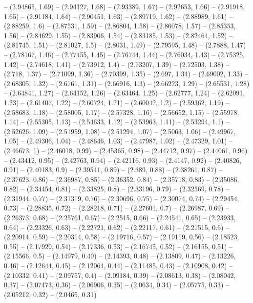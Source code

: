 -- (2.94865, 1.69)
-- (2.94127, 1.68)
-- (2.93389, 1.67)
-- (2.92653, 1.66)
-- (2.91918, 1.65)
-- (2.91184, 1.64)
-- (2.90451, 1.63)
-- (2.89719, 1.62)
-- (2.88989, 1.61)
-- (2.88259, 1.6)
-- (2.87531, 1.59)
-- (2.86804, 1.58)
-- (2.86078, 1.57)
-- (2.85353, 1.56)
-- (2.84629, 1.55)
-- (2.83906, 1.54)
-- (2.83185, 1.53)
-- (2.82464, 1.52)
-- (2.81745, 1.51)
-- (2.81027, 1.5)
-- (2.8031, 1.49)
-- (2.79595, 1.48)
-- (2.7888, 1.47)
-- (2.78167, 1.46)
-- (2.77455, 1.45)
-- (2.76744, 1.44)
-- (2.76034, 1.43)
-- (2.75325, 1.42)
-- (2.74618, 1.41)
-- (2.73912, 1.4)
-- (2.73207, 1.39)
-- (2.72503, 1.38)
-- (2.718, 1.37)
-- (2.71099, 1.36)
-- (2.70399, 1.35)
-- (2.697, 1.34)
-- (2.69002, 1.33)
-- (2.68305, 1.32)
-- (2.6761, 1.31)
-- (2.66916, 1.3)
-- (2.66223, 1.29)
-- (2.65531, 1.28)
-- (2.64841, 1.27)
-- (2.64152, 1.26)
-- (2.63464, 1.25)
-- (2.62777, 1.24)
-- (2.62091, 1.23)
-- (2.61407, 1.22)
-- (2.60724, 1.21)
-- (2.60042, 1.2)
-- (2.59362, 1.19)
-- (2.58683, 1.18)
-- (2.58005, 1.17)
-- (2.57328, 1.16)
-- (2.56652, 1.15)
-- (2.55978, 1.14)
-- (2.55305, 1.13)
-- (2.54633, 1.12)
-- (2.53963, 1.11)
-- (2.53294, 1.1)
-- (2.52626, 1.09)
-- (2.51959, 1.08)
-- (2.51294, 1.07)
-- (2.5063, 1.06)
-- (2.49967, 1.05)
-- (2.49306, 1.04)
-- (2.48646, 1.03)
-- (2.47987, 1.02)
-- (2.47329, 1.01)
-- (2.46673, 1)
-- (2.46018, 0.99)
-- (2.45365, 0.98)
-- (2.44712, 0.97)
-- (2.44061, 0.96)
-- (2.43412, 0.95)
-- (2.42763, 0.94)
-- (2.42116, 0.93)
-- (2.4147, 0.92)
-- (2.40826, 0.91)
-- (2.40183, 0.9)
-- (2.39541, 0.89)
-- (2.389, 0.88)
-- (2.38261, 0.87)
-- (2.37623, 0.86)
-- (2.36987, 0.85)
-- (2.36352, 0.84)
-- (2.35718, 0.83)
-- (2.35086, 0.82)
-- (2.34454, 0.81)
-- (2.33825, 0.8)
-- (2.33196, 0.79)
-- (2.32569, 0.78)
-- (2.31944, 0.77)
-- (2.31319, 0.76)
-- (2.30696, 0.75)
-- (2.30074, 0.74)
-- (2.29454, 0.73)
-- (2.28835, 0.72)
-- (2.28218, 0.71)
-- (2.27601, 0.7)
-- (2.26987, 0.69)
-- (2.26373, 0.68)
-- (2.25761, 0.67)
-- (2.2515, 0.66)
-- (2.24541, 0.65)
-- (2.23933, 0.64)
-- (2.23326, 0.63)
-- (2.22721, 0.62)
-- (2.22117, 0.61)
-- (2.21515, 0.6)
-- (2.20914, 0.59)
-- (2.20314, 0.58)
-- (2.19716, 0.57)
-- (2.19119, 0.56)
-- (2.18523, 0.55)
-- (2.17929, 0.54)
-- (2.17336, 0.53)
-- (2.16745, 0.52)
-- (2.16155, 0.51)
-- (2.15566, 0.5)
-- (2.14979, 0.49)
-- (2.14393, 0.48)
-- (2.13809, 0.47)
-- (2.13226, 0.46)
-- (2.12644, 0.45)
-- (2.12064, 0.44)
-- (2.11485, 0.43)
-- (2.10908, 0.42)
-- (2.10332, 0.41)
-- (2.09757, 0.4)
-- (2.09184, 0.39)
-- (2.08613, 0.38)
-- (2.08042, 0.37)
-- (2.07473, 0.36)
-- (2.06906, 0.35)
-- (2.0634, 0.34)
-- (2.05775, 0.33)
-- (2.05212, 0.32)
-- (2.0465, 0.31)
